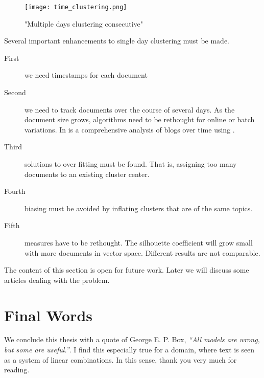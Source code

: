    \begin{figure}[h!]
      \centering
        \texttt{[image: time\_clustering.png]}
        \caption{"Multiple days clustering consecutive"}
        \label{time_clustering}
    \end{figure} 

  Several important enhancements to single day clustering must be made.

  \begin{description}
    \item[First] we need timestamps for each document
    \item[Second] we need to track documents over the course of several days. As the document size grows, algorithms need to be rethought for online or batch variations. In \cite{BlogTopicLDA2013} is a comprehensive analysis of blogs over time using \lda{}.
    \item[Third] solutions to over fitting must be found. That is, assigning too many documents to an existing cluster center.
    \item[Fourth] biasing must be avoided by inflating clusters that are of the same topics.
    \item[Fifth] measures have to be rethought. The silhouette coefficient will grow small with more documents in vector space. Different results are not comparable.
  \end{description}

  The content of this section is open for future work. Later we will discuss some articles dealing with the problem.

\section{Final Words}
We conclude this thesis with a quote of George E. P. Box, \emph{``All models are wrong, but some are useful.''}. I find this especially true for a domain, where text is seen as a system of linear combinations. In this sense, thank you very much for reading.

